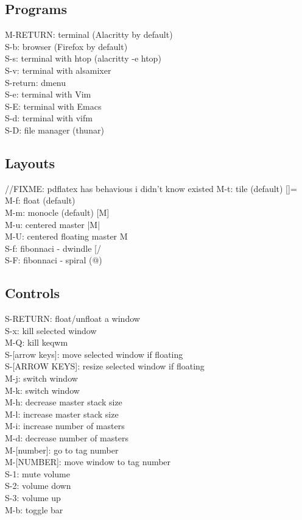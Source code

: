 \documentclass[12pt,letterpaper]{book}
\begin{document}
\subsection{Programs}
M-RETURN: terminal (Alacritty by default) \\
S-b: browser (Firefox by default) \\
S-s: terminal with htop (alacritty -e htop) \\
S-v: terminal with alsamixer \\
S-return: dmenu \\
S-e: terminal with Vim \\
S-E: terminal with Emacs \\
S-d: terminal with vifm \\
S-D: file manager (thunar) \\


\subsection{Layouts} //FIXME: pdflatex has behavious i didn't know existed
M-t: tile (default)		[]= \\
M-f: float (default)		\>\<\> \\
M-m: monocle (default)		[M] \\
M-u: centered master		|M| \\
M-U: centered floating master	\<M\< \\
S-f: fibonnaci - dwindle	[/\] \\
S-F: fibonnaci - spiral		(@) \\


\subsection{Controls}
S-RETURN: float/unfloat a window \\
S-x: kill selected window \\
M-Q: kill keqwm \\
S-[arrow keys]: move selected window if floating \\
S-[ARROW KEYS]: resize selected window if floating \\
M-j: switch window \\
M-k: switch window \\
M-h: decrease master stack size \\
M-l: increase master stack size \\
M-i: increase number of masters \\
M-d: decrease number of masters \\
M-[number]: go to tag number \\
M-[NUMBER]: move window to tag number \\
S-1: mute volume \\
S-2: volume down \\
S-3: volume up \\
M-b: toggle bar \\
\end{document}
